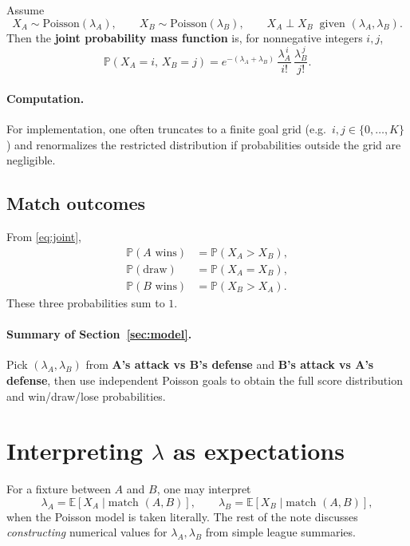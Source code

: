 \documentclass[11pt,a4paper]{article}
\begin{document}
Assume
\begin{equation}
  X_A \sim \mathrm{Poisson}(\lambda_A), \qquad
  X_B \sim \mathrm{Poisson}(\lambda_B), \qquad
  X_A \perp X_B \ \text{ given } (\lambda_A,\lambda_B).
  \label{eq:indep}
\end{equation}
Then the \textbf{joint probability mass function} is, for nonnegative integers $i,j$,
\begin{equation}
  \mathbb{P}(X_A=i,\, X_B=j)
  = e^{-(\lambda_A+\lambda_B)}\,\frac{\lambda_A^{\,i}}{i!}\,\frac{\lambda_B^{\,j}}{j!}.
  \label{eq:joint}
\end{equation}

\paragraph{Computation.}
For implementation, one often truncates to a finite goal grid (e.g.\ $i,j \in \{0,\ldots,K\}$) and renormalizes the restricted distribution if probabilities outside the grid are negligible.

\subsection{Match outcomes}

From \eqref{eq:joint},
\begin{align*}
  \mathbb{P}(A \text{ wins}) &= \mathbb{P}(X_A > X_B), \\
  \mathbb{P}(\text{draw})   &= \mathbb{P}(X_A = X_B), \\
  \mathbb{P}(B \text{ wins}) &= \mathbb{P}(X_B > X_A).
\end{align*}
These three probabilities sum to $1$.

\paragraph{Summary of Section~\ref{sec:model}.}
Pick $(\lambda_A,\lambda_B)$ from \textbf{A's attack vs B's defense} and \textbf{B's attack vs A's defense}, then use independent Poisson goals to obtain the full score distribution and win/draw/lose probabilities.

\section{Interpreting $\lambda$ as expectations}

For a fixture between $A$ and $B$, one may interpret
\[
  \lambda_A = \mathbb{E}[X_A \mid \text{match } (A,B)], \qquad
  \lambda_B = \mathbb{E}[X_B \mid \text{match } (A,B)],
\]
when the Poisson model is taken literally. The rest of the note discusses \emph{constructing} numerical values for $\lambda_A,\lambda_B$ from simple league summaries.
\end{document}
